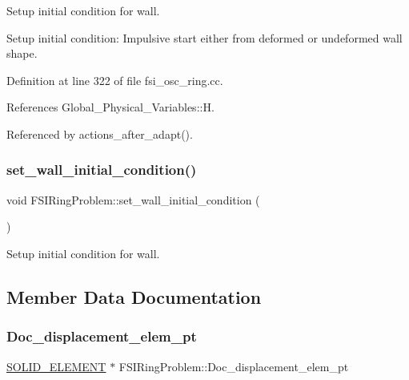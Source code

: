 Setup initial condition for wall. 

Setup initial condition\+: Impulsive start either from deformed or undeformed wall shape. 

Definition at line 322 of file fsi\+\_\+osc\+\_\+ring.\+cc.



References Global\+\_\+\+Physical\+\_\+\+Variables\+::H.



Referenced by actions\+\_\+after\+\_\+adapt().

\mbox{\label{classFSIRingProblem_a5f987c1b22dc306cf7d26be7fa74e322}} 
\subsubsection{\texorpdfstring{set\+\_\+wall\+\_\+initial\+\_\+condition()}{set\_wall\_initial\_condition()}\hspace{0.1cm}{\footnotesize\ttfamily [2/2]}}
{\footnotesize\ttfamily void F\+S\+I\+Ring\+Problem\+::set\+\_\+wall\+\_\+initial\+\_\+condition (\begin{DoxyParamCaption}{ }\end{DoxyParamCaption})\hspace{0.3cm}{\ttfamily [private]}}



Setup initial condition for wall. 



\subsection{Member Data Documentation}
\mbox{\label{classFSIRingProblem_a85d9441c676456c71dffc27500bd0fec}} 
\subsubsection{\texorpdfstring{Doc\+\_\+displacement\+\_\+elem\+\_\+pt}{Doc\_displacement\_elem\_pt}}
{\footnotesize\ttfamily \hyperlink{classFSIRingProblem_a96528378f3baf6100aeb6b4fe83bc870}{S\+O\+L\+I\+D\+\_\+\+E\+L\+E\+M\+E\+NT} $\ast$ F\+S\+I\+Ring\+Problem\+::\+Doc\+\_\+displacement\+\_\+elem\+\_\+pt\hspace{0.3cm}{\ttfamily [private]}}




